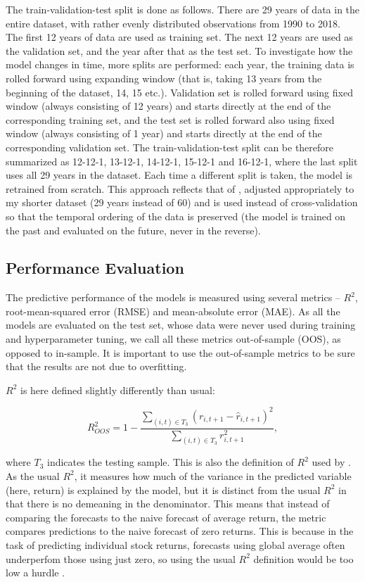	The train-validation-test split is done as follows. There are 29 years of data in the entire dataset, with rather evenly distributed observations from 1990 to 2018. The first 12 years of data are used as training set. The next 12 years are used as the validation set, and the year after that as the test set. To investigate how the model changes in time, more splits are performed: each year, the training data is rolled forward using expanding window (that is, taking 13 years from the beginning of the dataset, 14, 15 etc.). Validation set is rolled forward using fixed window (always consisting of 12 years) and starts directly at the end of the corresponding training set, and the test set is rolled forward also using fixed window (always consisting of 1 year) and starts directly at the end of the corresponding validation set. The train-validation-test split can be therefore summarized as 12-12-1, 13-12-1, 14-12-1, 15-12-1 and 16-12-1, where the last split uses all 29 years in the dataset. Each time a different split is taken, the model is retrained from scratch. This approach reflects that of \cite{gu2020empirical}, adjusted appropriately to my shorter dataset (29 years instead of 60) and is used instead of cross-validation so that the temporal ordering of the data is preserved (the model is trained on the past and evaluated on the future, never in the reverse).    


	\subsection{Performance Evaluation}
	The predictive performance of the models is measured using several metrics – $R^2$, root-mean-squared error (RMSE) and mean-absolute error (MAE). As all the models are evaluated on the test set, whose data were never used during training and hyperparameter tuning, we call all these metrics out-of-sample (OOS), as opposed to in-sample. It is important to use the out-of-sample metrics to be sure that the results are not due to overfitting. 
	
	$R^2$ is here defined slightly differently than usual:
	
	\begin{equation}
		R^2_{OOS} = 1 - \frac{ \sum_{(i,t)\in T_3} \left(r_{i,t+1}-	\hat{r}_{i, t+1}\right) ^2}{\sum_{(i,t)\in T_3} r_{i,t+1}^2}, 		
	\end{equation}
	
	where $T_3$ indicates the testing sample. This is also the definition of $R^2$ used by \cite{gu2020empirical}. As the usual $R^2$, it measures how much of the variance in the predicted variable (here, return) is explained by the model, but it is distinct from the usual $R^2$ in that there is no demeaning in the denominator. This means that instead of comparing the forecasts to the naive forecast of average return, the metric compares predictions to the naive forecast of zero returns. This is because in the task of predicting individual stock returns, forecasts using global average often underperfom those using just zero, so using the usual $R^2$ definition would be too low a hurdle \citep{gu2020empirical}. 
	
